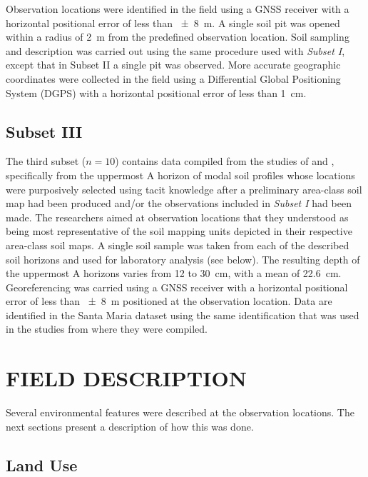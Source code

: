Observation locations were identified in the field using a GNSS receiver with a horizontal positional error
of less than \SI{\pm8}{\metre}. A single soil pit was opened within a radius of \SI{2}{\metre} from the 
predefined 
observation location. Soil sampling and description was carried out using the same procedure used with 
\emph{Subset I}, except that in Subset II a single pit was observed. More accurate geographic coordinates were 
collected in the field using a Differential Global Positioning System (DGPS) with a horizontal positional error 
of less than \SI{1}{\centi\metre}.

\subsection{Subset III}

The third subset ($n = 10$) contains data compiled from the studies of  and
, specifically from the uppermost A horizon of modal soil profiles whose locations 
were purposively selected using tacit knowledge after a preliminary area-class soil map had been produced 
and/or the observations included in \emph{Subset I} had been made. The researchers aimed at observation 
locations that they understood as being most representative of the soil mapping units depicted in their 
respective area-class soil maps. A single soil sample was taken from each of the described soil horizons and 
used for laboratory analysis (see below). The resulting depth of the uppermost A horizons varies from \num{12} 
to \SI{30}{\centi\metre}, with a mean of \SI{22.6}{\centi\metre}. Georeferencing was carried using a GNSS 
receiver with a horizontal positional error of less than \SI{\pm8}{\metre} positioned at the observation 
location. Data are identified in the Santa Maria dataset using the same identification that was used in the 
studies from where they were compiled.

\section{FIELD DESCRIPTION}

Several environmental features were described at the observation locations. The next sections present a 
description of how this was done.

\subsection{Land Use}

